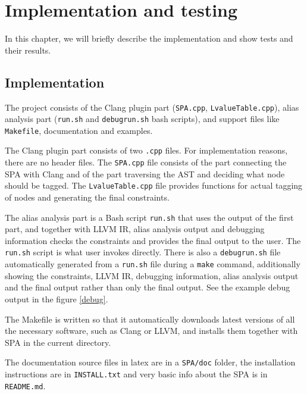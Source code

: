 \chapter{Implementation and testing}
In this chapter, we will briefly describe the implementation and show tests and their results.
\section{Implementation}
The project consists of the Clang plugin part (\verb|SPA.cpp|, \verb|LvalueTable.cpp|), alias analysis part (\verb|run.sh| and \verb|debugrun.sh| bash scripts), and support files like \verb|Makefile|, documentation and examples.

The Clang plugin part consists of two \verb|.cpp| files. For implementation reasons, there are no header files. The \verb|SPA.cpp| file consists of the part connecting the SPA with Clang and of the part traversing the AST and deciding what node should be tagged. The \verb|LvalueTable.cpp| file provides functions for actual tagging of nodes and generating the final constraints.

The alias analysis part is a Bash script \verb|run.sh| that uses the output of the first part, and together with LLVM IR, alias analysis output and debugging information checks the constraints and provides the final output to the user. The \verb|run.sh| script is what user invokes directly. There is also a \verb|debugrun.sh| file automatically generated from a \verb|run.sh| file during a \verb|make| command, additionally showing the constraints, LLVM IR, debugging information, alias analysis output and the final output rather than only the final output. See the example debug output in the figure \ref{debug}.

The Makefile is written so that it automatically downloads latest versions of all the necessary software, such as Clang or LLVM, and installs them together with SPA in the current directory.

The documentation source files in latex are in a \verb|SPA/doc| folder, the installation instructions are in \verb|INSTALL.txt| and very basic info about the SPA is in \verb|README.md|.

